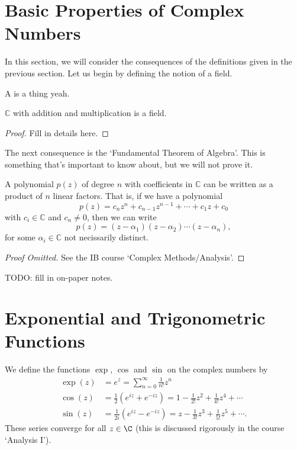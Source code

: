 \documentclass[a4]{scrreprt}
\begin{document}
\section{Basic Properties of Complex Numbers}

In this section, we will consider the consequences of the definitions given in the previous section.
Let us begin by defining the notion of a field.

\begin{definition}
	A  is a thing yeah.
\end{definition}

\begin{proposition}
	$\mathbb{C}$ with addition and multiplication is a field.
\end{proposition}
\begin{proof}
	Fill in details here.
\end{proof}

The next consequence is the `Fundamental Theorem of Algebra'.
This is something that's important to know about, but we will not prove it.

\begin{theorem}
	A polynomial $p(z)$ of degree $n$ with coefficients in $\mathbb{C}$ can be written as a product of $n$ linear factors. That is, if we have a polynomial
	$$
	p(z) = c_n z^n + c_{n - 1} z^{n - 1} + \cdots + c_1 z + c_0
	$$
	with $c_i \in \mathbb{C}$ and $c_n \neq 0$, then we can write
	$$
	p(z) = (z - \alpha_1) (z - \alpha_2) \cdots (z - \alpha_n),
	$$ 
	for some $\alpha_i \in \mathbb{C}$ not necissarily distinct.
\end{theorem}
\begin{proof}[Proof Omitted]
	See the IB course `Complex Methods/Analysis'.
\end{proof}

{\color{red} TODO: fill in on-paper notes.}

\section{Exponential and Trigonometric Functions}

We define the functions $\exp$, $\cos$ and $\sin$ on the complex numbers by
\begin{align*}
	\exp(z) &= e^z = \sum_{n = 0}^\infty \frac{1}{n!} z^n \\
	\cos (z) &= \frac{1}{2}(e^{iz} + e^{-iz}) = 1 - \frac{1}{2!} z^2 + \frac{1}{4!} z^4 + \cdots \\
	\sin (z) &= \frac{1}{2i}(e^{iz} - e^{-iz}) = z - \frac{1}{3!}z^3 + \frac{1}{5!} z^5 + \cdots.
\end{align*}
These series converge for all $z \in \C$ (this is discussed rigorously in the course `Analysis I').
\end{document}
